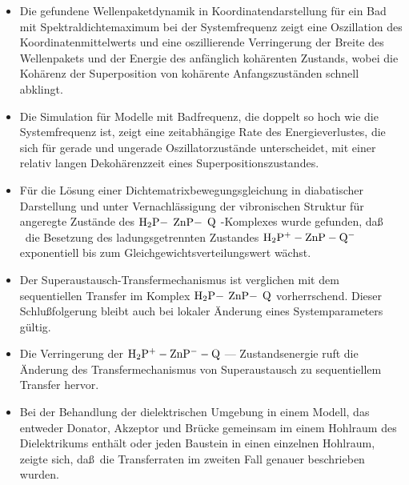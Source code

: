 \documentclass[12pt,twoside,a4paper]{report}
\begin{document}
{\begin{itemize}
\item
Die gefundene Wellenpaketdynamik  in Koordinatendarstellung 
    f\"ur ein  
         Bad 
            mit Spektraldichtemaximum 
                bei der Systemfrequenz
zeigt 
        eine Oszillation des Koordinatenmittelwerts
und 
        eine oszillierende Verringerung der Breite des Wellenpakets
und der Energie des anf\"anglich koh\"arenten Zustands, 
wobei die Koh\"arenz der Superposition 
von koh\"arente Anfangszust\"anden schnell abklingt.



\item
Die Simulation f\"ur Modelle mit Badfrequenz,
die doppelt so hoch wie die Systemfrequenz ist,
zeigt eine zeitabh\"angige Rate des Energieverlustes, 
die sich
f\"ur 
gerade und ungerade Oszillatorzust\"ande unterscheidet,
mit einer relativ langen
Dekoh\"arenzzeit eines Superpositionszustandes. 



\item
F\"ur die L\"osung einer Dichtematrixbewegungsgleichung
in diabatischer Darstellung 
und unter Vernachl\"assigung der vibronischen Struktur 
f\"ur angeregte Zust\"ande des 
${\rm H_2P-}$
${\rm ZnP-}$
${\rm Q}$
-Komplexes
wurde gefunden,
da\ss
~die Besetzung des ladungsgetrennten Zustandes  ${\rm H_2P^+-ZnP-Q^-}$
 exponentiell bis zum Gleichgewichtsverteilungs\-wert w\"achst.




\item
Der Superaustausch-Transfermechanismus 
ist verglichen mit dem
sequentiellen Transfer 
im Komplex 
${\rm H_2P-}$
${\rm ZnP-}$
${\rm Q}$
vorherrschend. 
Dieser Schlu\ss folgerung  bleibt auch  bei 
lokaler \"Anderung eines Systemparameters
g\"ultig.



\item
Die Verringerung der 
${\rm H_2P^+-ZnP^--Q}$ --- Zustandsenergie
ruft die \"Anderung des Transfermechanismus 
von  Superaustausch zu
sequentiellem Transfer  
hervor.





\item
Bei der Behandlung der dielektrischen Umgebung 
in einem Modell, das entweder 
Donator, Akzeptor und Br\"ucke gemeinsam im einem Hohlraum des Dielektrikums enth\"alt
oder jeden Baustein 
in einen einzelnen Hohlraum, 
zeigte sich, da\ss ~die
Transferraten 
im zweiten Fall
genauer beschrieben wurden.




\end{itemize}}
\end{document}
